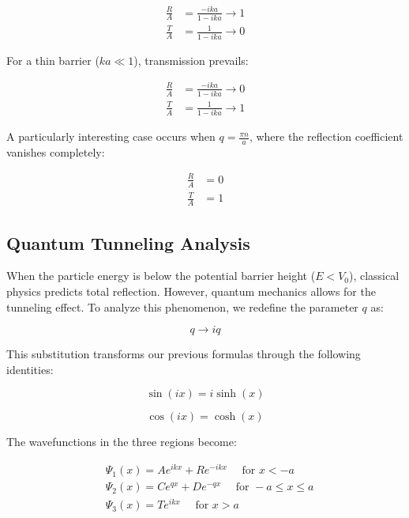 \documentclass[italian]{HKNdocument}
\begin{document}
\begin{align}
\frac{R}{A} & =\frac{-i k a}{1-i k a} \rightarrow 1 \\
\frac{T}{A} & =\frac{1}{1-i k a} \rightarrow 0
\end{align}

For a thin barrier ($ka \ll 1$), transmission prevails:

\begin{align}
\frac{R}{A} & =\frac{-i k a}{1-i k a} \rightarrow 0 \\
\frac{T}{A} & =\frac{1}{1-i k a} \rightarrow 1
\end{align}

A particularly interesting case occurs when $q=\frac{\pi n}{a}$, where the reflection coefficient vanishes completely:

\begin{align}
\frac{R}{A} & =0 \\
\frac{T}{A} & =1
\end{align}


\subsection{Quantum Tunneling Analysis}

When the particle energy is below the potential barrier height ($E < V_0$), classical physics predicts total reflection. However, quantum mechanics allows for the tunneling effect. To analyze this phenomenon, we redefine the parameter $q$ as:

\begin{equation}
q \rightarrow i q
\end{equation}

This substitution transforms our previous formulas through the following identities:

\begin{equation}
\sin (i x)=i \sinh (x)
\end{equation}

\begin{equation}
\cos (i x)=\cosh (x)
\end{equation}

The wavefunctions in the three regions become:

\begin{align}
& \Psi_{1}(x)=A e^{i k x}+R e^{-i k x} \quad \text { for } x<-a \\
& \Psi_{2}(x)=C e^{q x}+D e^{-q x} \quad \text { for }-a \leq x \leq a  \\
& \Psi_{3}(x)=T e^{i k x} \quad \text { for } x>a
\end{align}
\end{document}
